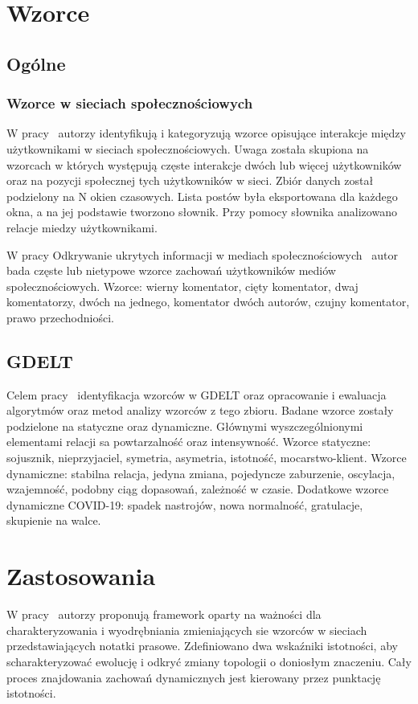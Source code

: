 \documentclass[11pt]{report}
\begin{document}
    \section{Wzorce}

    \subsection{Ogólne}

    \subsubsection{Wzorce w sieciach społecznościowych}
    W pracy~\cite{10.1093/jigpal/jzaa042} autorzy identyfikują i kategoryzują wzorce opisujące interakcje między użytkownikami w sieciach społecznościowych.
    Uwaga została skupiona na wzorcach w których występują częste interakcje dwóch lub więcej użytkowników oraz na pozycji społecznej tych użytkowników w sieci.
    Zbiór danych został podzielony na N okien czasowych.
    Lista postów była eksportowana dla każdego okna, a na jej podstawie tworzono słownik.
    Przy pomocy słownika analizowano relacje miedzy użytkownikami.

    W pracy Odkrywanie ukrytych informacji w mediach społecznościowych~\cite{Skwara2019} autor bada częste lub nietypowe wzorce zachowań użytkowników mediów społecznościowych.
    Wzorce: wierny komentator, cięty komentator, dwaj komentatorzy, dwóch na jednego, komentator dwóch autorów, czujny komentator, prawo przechodniości.

    \subsection{GDELT}\label{subsec:gdelt}
    Celem pracy~\cite{Jarosz2020} identyfikacja wzorców w GDELT oraz opracowanie i ewaluacja algorytmów oraz metod analizy wzorców z tego zbioru\@.
    Badane wzorce zostały podzielone na statyczne oraz dynamiczne.
    Głównymi wyszczególnionymi elementami relacji sa powtarzalność oraz intensywność.
    Wzorce statyczne: sojusznik, nieprzyjaciel, symetria, asymetria, istotność, mocarstwo-klient.
    Wzorce dynamiczne: stabilna relacja, jedyna zmiana, pojedyncze zaburzenie, oscylacja, wzajemność, podobny ciąg dopasowań, zależność w czasie.
    Dodatkowe wzorce dynamiczne COVID-19: spadek nastrojów, nowa normalność, gratulacje, skupienie na walce.


    \section{Zastosowania}
    W pracy~\cite{Yan2012} autorzy proponują framework oparty na ważności dla charakteryzowania i wyodrębniania zmieniających sie wzorców w sieciach przedstawiających notatki prasowe.
    Zdefiniowano dwa wskaźniki istotności, aby scharakteryzować ewolucję i odkryć zmiany topologii o doniosłym znaczeniu.
    Cały proces znajdowania zachowań dynamicznych jest kierowany przez punktację istotności.
\end{document}
